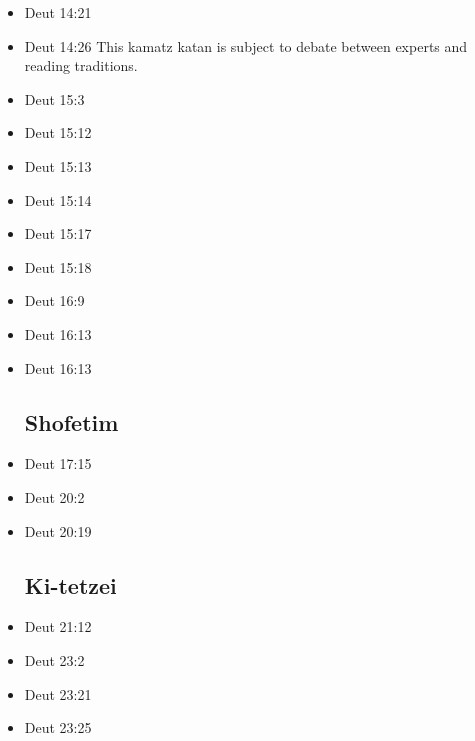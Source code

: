 \documentclass[14pt]{book}
\begin{document}
\begin{multicols}{2}
\begin{itemize}
\item Deut 14:21

\item Deut 14:26 This kamatz katan is subject to debate between experts and reading traditions.

\item Deut 15:3

\item Deut 15:12

\item Deut 15:13

\item Deut 15:14

\item Deut 15:17

\item Deut 15:18

\item Deut 16:9

\item Deut 16:13

\item Deut 16:13

\subsection{Shofetim}

\item Deut 17:15

\item Deut 20:2

\item Deut 20:19

\subsection{Ki-tetzei}

\item Deut 21:12

\item Deut 23:2

\item Deut 23:21

\item Deut 23:25


\end{itemize}
\end{multicols}
\end{document}
